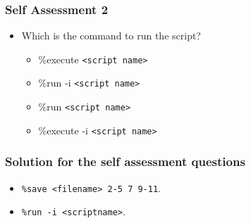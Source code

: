 \documentclass[17pt]{beamer}
\begin{document}
\begin{frame}[fragile]
  \frametitle{Self Assessment 2}
  \begin{itemize}
  \item Which is the command to run the script?
       \begin{itemize}
         \item \%execute \texttt {<script name>}
         \item \%run -i \texttt {<script name>} 
         \item \%run \texttt {<script name>} 
         \item \%execute -i \texttt {<script name>}
       \end{itemize}
    \end{itemize} 
\end{frame}

\begin{frame}[fragile]
	\frametitle{Solution for the self assessment questions}
	\begin{itemize}
         \item \texttt{\%save <filename> 2-5 7 9-11}.\pause
         \item \texttt{\%run -i <scriptname>}.
         \end{itemize}
\end{frame}
\end{document}
